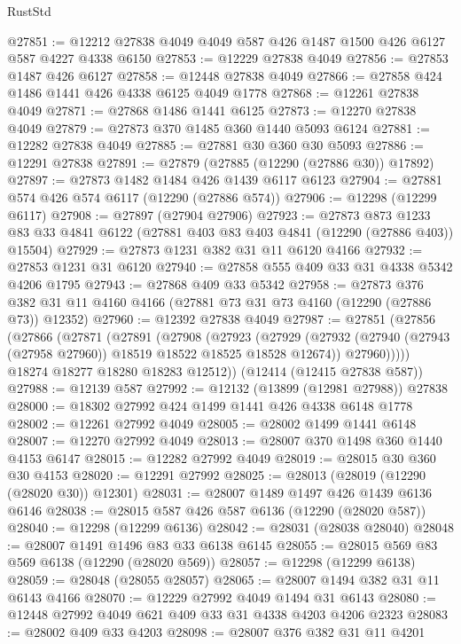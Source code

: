 \begin{lexlean}{RustStd}
\begin{coremodule}
{\begin{coremodule}
{{{{{{{{{{{{{{{{{{{{{{{{{{{{{{{{{{{{{{{{{{{{{{{{{{@27851 := @12212 @27838 @4049 @4049 @587 @426 @1487 @1500 @426 @6127 @587 @4227 @4338 @6150
@27853 := @12229 @27838 @4049
@27856 := @27853 @1487 @426 @6127
@27858 := @12448 @27838 @4049
@27866 := @27858 @424 @1486 @1441 @426 @4338 @6125 @4049 @1778
@27868 := @12261 @27838 @4049
@27871 := @27868 @1486 @1441 @6125
@27873 := @12270 @27838 @4049
@27879 := @27873 @370 @1485 @360 @1440 @5093 @6124
@27881 := @12282 @27838 @4049
@27885 := @27881 @30 @360 @30 @5093
@27886 := @12291 @27838
@27891 := @27879 (@27885 (@12290 (@27886 @30)) @17892)
@27897 := @27873 @1482 @1484 @426 @1439 @6117 @6123
@27904 := @27881 @574 @426 @574 @6117 (@12290 (@27886 @574))
@27906 := @12298 (@12299 @6117)
@27908 := @27897 (@27904 @27906)
@27923 := @27873
    @873
    @1233
    @83
    @33
    @4841
    @6122
    (@27881 @403 @83 @403 @4841 (@12290 (@27886 @403)) @15504)
@27929 := @27873 @1231 @382 @31 @11 @6120 @4166
@27932 := @27853 @1231 @31 @6120
@27940 := @27858 @555 @409 @33 @31 @4338 @5342 @4206 @1795
@27943 := @27868 @409 @33 @5342
@27958 := @27873
    @376
    @382
    @31
    @11
    @4160
    @4166
    (@27881 @73 @31 @73 @4160 (@12290 (@27886 @73)) @12352)
@27960 := @12392 @27838 @4049
@27987 := @27851
    (@27856
      (@27866
        (@27871
          (@27891
            (@27908
              (@27923
                (@27929
                  (@27932 (@27940 (@27943 (@27958 @27960)) @18519 @18522 @18525 @18528 @12674))
                  @27960)))))
        @18274
        @18277
        @18280
        @18283
        @12512))
    (@12414 (@12415 @27838 @587))
@27988 := @12139 @587
@27992 := @12132 (@13899 (@12981 @27988)) @27838
@28000 := @18302 @27992 @424 @1499 @1441 @426 @4338 @6148 @1778
@28002 := @12261 @27992 @4049
@28005 := @28002 @1499 @1441 @6148
@28007 := @12270 @27992 @4049
@28013 := @28007 @370 @1498 @360 @1440 @4153 @6147
@28015 := @12282 @27992 @4049
@28019 := @28015 @30 @360 @30 @4153
@28020 := @12291 @27992
@28025 := @28013 (@28019 (@12290 (@28020 @30)) @12301)
@28031 := @28007 @1489 @1497 @426 @1439 @6136 @6146
@28038 := @28015 @587 @426 @587 @6136 (@12290 (@28020 @587))
@28040 := @12298 (@12299 @6136)
@28042 := @28031 (@28038 @28040)
@28048 := @28007 @1491 @1496 @83 @33 @6138 @6145
@28055 := @28015 @569 @83 @569 @6138 (@12290 (@28020 @569))
@28057 := @12298 (@12299 @6138)
@28059 := @28048 (@28055 @28057)
@28065 := @28007 @1494 @382 @31 @11 @6143 @4166
@28070 := @12229 @27992 @4049 @1494 @31 @6143
@28080 := @12448 @27992 @4049 @621 @409 @33 @31 @4338 @4203 @4206 @2323
@28083 := @28002 @409 @33 @4203
@28098 := @28007
    @376
    @382
    @31
    @11
    @4201
}}}}}}}}}}}}}}}}}}}}}}}}}}}}}}}}}}}}}}}}}}}}}}}}}}
\end{coremodule}}
\end{coremodule}
\end{lexlean}
